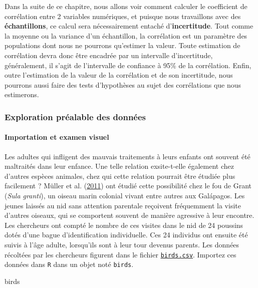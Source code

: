 \documentclass[
  a4paper,
]{article}
\newenvironment{Shaded}{\begin{snugshade}}{\end{snugshade}}
\newcommand{\NormalTok}[1]{\textcolor[rgb]{0.12,0.11,0.11}{#1}}
\begin{document}
Dans la suite de ce chapitre, nous allons voir comment calculer le coefficient de corrélation entre 2 variables numériques, et puisque nous travaillons avec des \textbf{échantillons}, ce calcul sera nécessairement entaché d'\textbf{incertitude}. Tout comme la moyenne ou la variance d'un échantillon, la corrélation est un paramètre des populations dont nous ne pourrons qu'estimer la valeur. Toute estimation de corrélation devra donc être encadrée par un intervalle d'incertitude, généralement, il s'agit de l'intervalle de confiance à 95\% de la corrélation. Enfin, outre l'estimation de la valeur de la corrélation et de son incertitude, nous pourrons aussi faire des tests d'hypothèses au sujet des corrélations que nous estimerons.

\hypertarget{exploration-pruxe9alable-des-donnuxe9es-2}{%
\subsubsection{Exploration préalable des données}\label{exploration-pruxe9alable-des-donnuxe9es-2}}

\hypertarget{importation-et-examen-visuel-4}{%
\paragraph{Importation et examen visuel}\label{importation-et-examen-visuel-4}}

Les adultes qui infligent des mauvais traitements à leurs enfants ont souvent été maltraités dans leur enfance. Une telle relation exsite-t-elle également chez d'autres espèces animales, chez qui cette relation pourrait être étudiée plus facilement ? Müller et al. (\protect\hyperlink{ref-muller2011}{2011}) ont étudié cette possibilité chez le fou de Grant (\emph{Sula granti}), un oiseau marin colonial vivant entre autres aux Galápagos. Les jeunes laissés au nid sans attention parentale reçoivent fréquemment la visite d'autres oiseaux, qui se comportent souvent de manière agressive à leur encontre. Les chercheurs ont compté le nombre de ces visites dans le nid de 24 poussins dotés d'une bague d'identification individuelle. Ces 24 individus ont ensuite été suivis à l'âge adulte, lorsqu'ils sont à leur tour devenus parents. Les données récoltées par les chercheurs figurent dans le fichier \href{https://besibo.github.io/Biometrie3/data/birds.csv}{\texttt{birds.csv}}. Importez ces données dans \texttt{R} dans un objet noté \texttt{birds}.

\begin{Shaded}
\begin{Highlighting}[]
\NormalTok{birds}
\end{Highlighting}
\end{Shaded}
\end{document}
